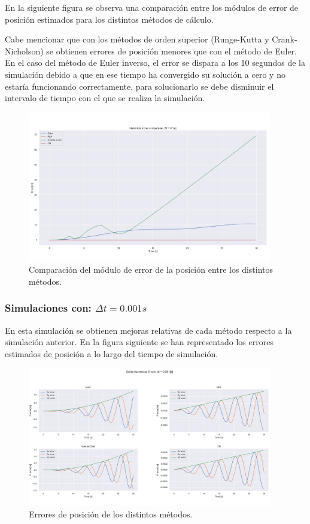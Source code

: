 \documentclass[12pt,a4paper]{article}
\begin{document}
En la siguiente figura se  observa una comparación entre los módulos de error de posición estimados para los distintos métodos de cálculo.

Cabe mencionar que con los métodos de orden superior (Runge-Kutta y Crank-Nicholson) se obtienen errores de posición menores que con el método de Euler. En el caso del método de Euler inverso, el error se dispara a los 10 segundos de la simulación debido a que en ese tiempo ha convergido su solución a cero y no estaría funcionando correctamente, para solucionarlo se debe disminuir el intervalo de tiempo con el que se realiza la simulación.
\begin{figure}[H] 
	\centering
	\includegraphics[width=0.95\textwidth]{FIGURES/dt0.1_error_comparison.png}
	\caption{Comparación del módulo de error de la posición entre los distintos métodos.}
\end{figure}


\subsubsection{Simulaciones con: $\Delta t = 0.001 s$}
En esta simulación se obtienen mejoras relativas de cada método respecto a la simulación anterior.
En la figura siguiente se han representado los errores estimados de posición a lo largo del tiempo de simulación.
\begin{figure}[H] 
	\centering
	\includegraphics[width=0.95\textwidth]{FIGURES/dt0.001_error.png}
	\caption{Errores de posición de los distintos métodos.}
\end{figure}
\end{document}
